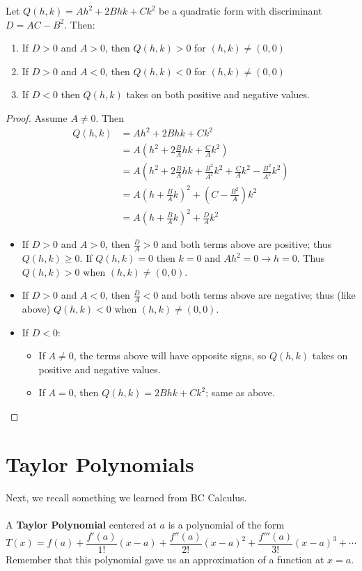 \documentclass[12pt]{article}
\begin{document}
\begin{lemma}
\label{quad}
Let $Q(h,k) = Ah^2 + 2Bhk + Ck^2$ be a quadratic form with discriminant $D = AC - B^2$. Then:
\begin{enumerate}
\item If $D > 0$ and $A > 0$, then $Q(h,k) > 0$ for $(h,k) \neq (0,0)$
\item If $D > 0$ and $A < 0$, then $Q(h,k) < 0$ for $(h,k) \neq (0,0)$
\item If $D < 0$ then $Q(h,k)$ takes on both positive and negative values.
\end{enumerate}
\end{lemma}
\begin{proof}
Assume $A \neq 0$. Then 
\[
\begin{aligned}
Q(h,k) &= Ah^2 + 2Bhk + Ck^2 \\
&= A\left(h^2 + 2\frac{B}{A}hk + \frac{C}{A}k^2\right) \\
&= A\left(h^2 + 2\frac{B}{A}hk + \frac{B^2}{A^2}k^2 + \frac{C}{A}k^2 - \frac{B^2}{A^2}k^2\right) \\
&= A\left(h + \frac{B}{A}k\right)^2 + \left(C - \frac{B^2}{A}\right)k^2 \\
&= A\left(h + \frac{B}{A}k\right)^2 + \frac{D}{A}k^2 
\end{aligned}
\]
\begin{itemize}
\item If $D>0$ and $A>0$, then $\frac{D}{A} > 0$ and both terms above are positive; thus $Q(h,k) \ge 0$. If $Q(h,k) = 0$ then $k=0$ and $Ah^2 = 0 \to h=0$. Thus $Q(h,k) > 0$ when $(h,k) \neq (0,0)$.
\item If $D>0$ and $A<0$, then $\frac{D}{A} < 0$ and both terms above are negative; thus (like above) $Q(h,k) < 0$ when $(h,k) \neq (0,0)$.
\item If $D<0$:
\begin{itemize}
\item If $A \neq 0$, the terms above will have opposite signs, so $Q(h,k)$ takes on positive and negative values.
\item If $A = 0$, then $Q(h,k) = 2Bhk + Ck^2$; same as above.
\end{itemize}
\end{itemize}
\end{proof}

\section{Taylor Polynomials}
Next, we recall something we learned from BC Calculus. \\ \\
A \textbf{Taylor Polynomial} centered at $a$ is a polynomial of the form \[ T(x) = f(a) + \frac{f'(a)}{1!}(x-a) + \frac{f''(a)}{2!}(x-a)^2 + \frac{f'''(a)}{3!}(x-a)^3 + \cdots \]
Remember that this polynomial gave us an approximation of a function at $x=a$.
\end{document}
